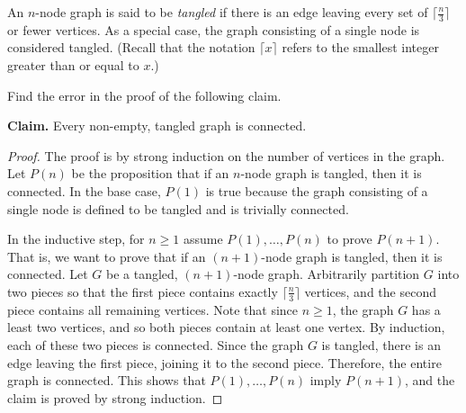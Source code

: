 \documentclass[12pt,twoside]{article}
\begin{document}
\begin{problem}{20}

An $n$-node graph is said to be {\em tangled} if there is an edge
leaving every set of $\lceil\frac{n}{3}\rceil$ or fewer vertices.  As
a special case, the graph consisting of a single node is considered
tangled.  (Recall that the notation $\lceil x \rceil$ refers to the
smallest integer greater than or equal to $x$.)

\begin{problemparts}

 Find the error in the proof of the following claim.

\bigskip

{\bf Claim.} Every non-empty, tangled graph is connected.

\bigskip

\begin{proof}
The proof is by strong induction on the number of vertices in the
graph.  Let $P(n)$ be the proposition that if an $n$-node graph is
tangled, then it is connected.  In the base case, $P(1)$ is true
because the graph consisting of a single node is defined to be tangled
and is trivially connected.

In the inductive step, for $n \geq 1$ assume $P(1), \ldots, P(n)$ to
prove $P(n+1)$.  That is, we want to prove that if an $(n+1)$-node
graph is tangled, then it is connected.  Let $G$ be a tangled,
$(n+1)$-node graph.  Arbitrarily partition $G$ into two pieces so that
the first piece contains exactly $\lceil\frac{n}{3}\rceil$ vertices,
and the second piece contains all remaining vertices.  Note that since
$n \geq 1$, the graph $G$ has a least two vertices, and so both pieces
contain at least one vertex.  By induction, each of these two pieces
is connected.  Since the graph $G$ is tangled, there is an edge
leaving the first piece, joining it to the second piece.  Therefore,
the entire graph is connected.  This shows that $P(1), \ldots, P(n)$
imply $P(n+1)$, and the claim is proved by strong induction.
\end{proof}

\end{problemparts}
\end{problem}
\end{document}
